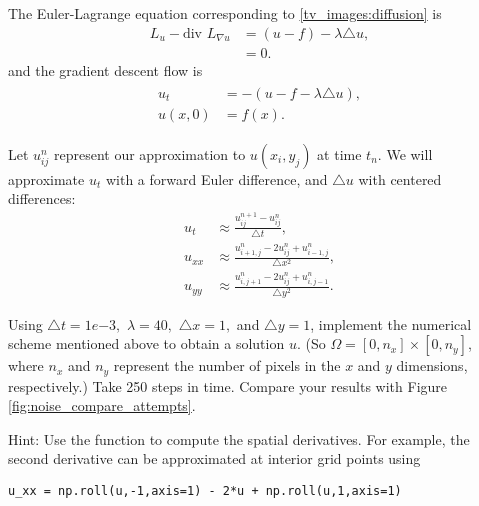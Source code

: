 The Euler-Lagrange equation corresponding to \eqref{tv_images:diffusion} is
\begin{align*}
L_u - \text{div } L_{\nabla u} &= (u-f) - \lambda \triangle u,\\
&= 0.
\end{align*}
and the gradient descent flow is
\begin{align}
    \begin{split}
u_t &= -(u-f -\lambda \triangle u),\\
u(x,0) &= f(x).
    \end{split} \label{tv_images:diffusion_flow}
\end{align}

Let $u_{ij}^n$ represent our approximation to $u(x_i,y_j)$ at time $t_n$. We will approximate $u_t$ with a forward Euler difference, and $\triangle u$ with centered differences:
\begin{align*}
    u_t &\approx \frac{u_{ij}^{n+1}-u_{ij}^n}{\triangle t},\\
    u_{xx} &\approx \frac{u_{i+1,j}^{n}-2u_{ij}^n + u_{i-1,j}^n}{\triangle x^2}, \\
    u_{yy} &\approx \frac{u_{i,j+1}^{n}-2u_{ij}^n + u_{i,j-1}^n}{\triangle y^2}.
\end{align*}


\begin{problem}
Using $\triangle t = 1e{-3},$ $\lambda = 40,$ $\triangle x = 1,$ and $\triangle y = 1$, implement the numerical scheme mentioned above to obtain a solution $u$. (So $\Omega = [0,n_x]\times [0,n_y]$, where $n_x$ and $n_y$ represent the number of pixels in the $x$ and $y$ dimensions, respectively.) Take 250 steps in time. Compare your results with Figure \ref{fig:noise_compare_attempts}.

Hint: Use the function  to compute the spatial derivatives. For example, the second derivative can be approximated at interior grid points using
\begin{lstlisting}
u_xx = np.roll(u,-1,axis=1) - 2*u + np.roll(u,1,axis=1)
\end{lstlisting}
\end{problem}




